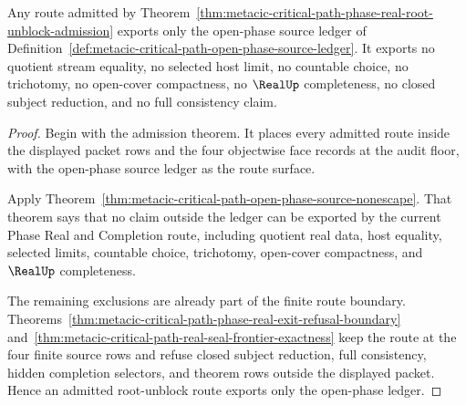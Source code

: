 \begin{theorem}
\label{thm:metacic-critical-path-phase-real-root-unblock-soundness}
Any route admitted by Theorem~\ref{thm:metacic-critical-path-phase-real-root-unblock-admission} exports only the open-phase source ledger of Definition~\ref{def:metacic-critical-path-open-phase-source-ledger}. It exports no quotient stream equality, no selected host limit, no countable choice, no trichotomy, no open-cover compactness, no $\RealUp$ completeness, no closed subject reduction, and no full consistency claim.
\end{theorem}
\begin{proof}
Begin with the admission theorem. It places every admitted route inside the displayed packet rows and the four objectwise face records at the audit floor, with the open-phase source ledger as the route surface.

Apply Theorem~\ref{thm:metacic-critical-path-open-phase-source-nonescape}. That theorem says that no claim outside the ledger can be exported by the current Phase Real and Completion route, including quotient real data, host equality, selected limits, countable choice, trichotomy, open-cover compactness, and $\RealUp$ completeness.

The remaining exclusions are already part of the finite route boundary. Theorems~\ref{thm:metacic-critical-path-phase-real-exit-refusal-boundary} and~\ref{thm:metacic-critical-path-real-seal-frontier-exactness} keep the route at the four finite source rows and refuse closed subject reduction, full consistency, hidden completion selectors, and theorem rows outside the displayed packet. Hence an admitted root-unblock route exports only the open-phase ledger.
\end{proof}

